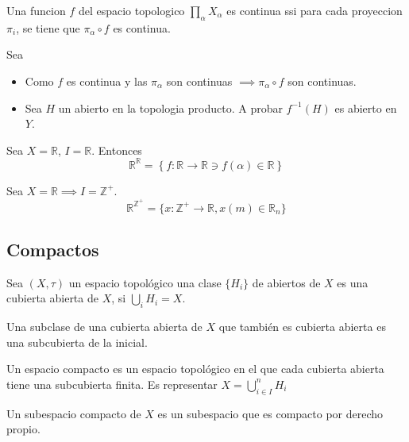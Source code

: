 \begin{problema}
    Una funcion $f$ del espacio topologico $\prod_\alpha X_\alpha$ es continua ssi para  cada proyeccion $\pi_i$, se tiene que $\pi_\alpha \circ f$ es continua. 
    \begin{dem}
        Sea 
        \begin{itemize}
            \item Como $f$ es continua y las $\pi_\alpha$ son continuas $\implies \pi_\alpha\circ f$ son continuas. 
            \item Sea $H$ un abierto en la topologia producto. A probar $f^{-1}(H)$ es abierto en $Y$. 
        \end{itemize}
    \end{dem}
\end{problema}

\begin{ejemplo}
    Sea $X=\mathbb{R}$, $I=\mathbb{R}$. Entonces
    $$\mathbb{R}^\mathbb{R}=\left\{f:\mathbb{R}\to \mathbb{R}\ni f(\alpha)\in \mathbb{R}\right\}$$
\end{ejemplo}

\begin{ejemplo}
    Sea $X=\mathbb{R}\implies I=\mathbb{Z}^+$. 
    $$\mathbb{R}^{\mathbb{Z}^+}=\{x:\mathbb{Z}^+ \to \mathbb{R}, x(m)\in \mathbb{R}_n\}$$
\end{ejemplo}

\subsection{Compactos}

\begin{definicion}
    Sea $(X,\tau)$ un espacio topológico una clase $\{H_i\}$ de abiertos de $X$ es una cubierta abierta de $X$, si $\bigcup_i H_i=X$. 
\end{definicion}

\begin{definicion}
    Una subclase de una cubierta abierta de $X$ que también es cubierta abierta es una subcubierta de la inicial. 
\end{definicion}
\begin{definicion}
    Un espacio compacto es un espacio topológico en el que cada cubierta abierta tiene una subcubierta finita. Es representar $X=\bigcup_{i\in I}^n H_i $
\end{definicion}

\begin{nota}
    Un subespacio compacto de $X$ es un subespacio que es compacto por derecho propio. 
\end{nota}

